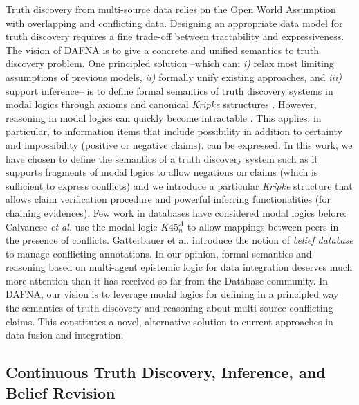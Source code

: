 \documentclass[prodmode,acmtecs]{acmsmall} %
\begin{document}
Truth discovery from multi-source data relies on the Open World Assumption with overlapping and conflicting data.
Designing an appropriate data model for truth discovery requires a fine trade-off between tractability and expressiveness. 
The vision of DAFNA is to give a concrete and unified semantics to  truth discovery problem. One principled solution --which 
can: {\it i)} relax most limiting assumptions of previous models, {\it ii)} formally unify existing approaches, and {\it iii)}
support inference-- is to define formal semantics of truth discovery systems in modal logics through axioms and canonical {\it Kripke}
sstructures \cite{GorankoOtto06}. However, reasoning in modal logics can quickly become intractable \cite{Gottlob92}. This applies, in
particular, to information items that include possibility in addition to certainty and impossibility (positive or negative claims). %
can be expressed. %
In this work, we have chosen to define the semantics of a truth discovery system such as it supports fragments of modal logics to allow
negations on claims (which is sufficient to express conflicts) and we introduce a particular {\it Kripke} structure that allows claim 
verification procedure and powerful inferring functionalities (for chaining evidences). Few work in databases have considered modal logics
before: %
Calvanese {\it et al.} \cite{CalvaneseGLLR08} use the modal logic $K45^A_n$ to allow mappings between peers in the presence of conflicts. 
Gatterbauer et al. \cite{GatterbauerBKS09} introduce the notion of {\it belief database} to manage conflicting annotations. In our opinion, 
formal semantics and reasoning based on multi-agent epistemic logic for data integration deserves much more attention than it has received 
so far from the Database community. In DAFNA, our vision is to leverage modal logics for defining in a principled way the semantics of truth 
discovery and reasoning about multi-source conflicting claims. This constitutes a novel, alternative solution to current approaches in data 
fusion and integration. 

\subsection{Continuous Truth Discovery, Inference, and Belief Revision }
\end{document}
